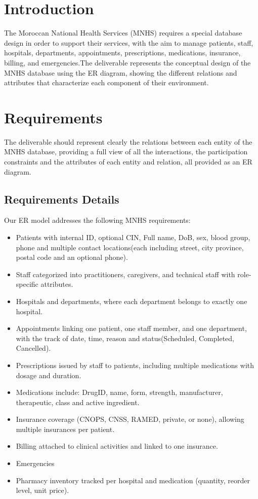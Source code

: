 \documentclass[a4paper,12pt]{article}
\begin{document}
\section{Introduction}
The Moroccan National Health Services (MNHS) requires a special database design in order to support their services, with the aim to manage patients, staff, hospitals, departments, appointments, prescriptions, medications, insurance, billing, and emergencies.The deliverable represents the conceptual design of the MNHS database using the ER diagram, showing the different relations and attributes that characterize each component of their environment. 

\section{Requirements}
The deliverable should represent clearly the relations between each  entity of the MNHS database, providing a full view of all the interactions, the participation constraints and the attributes of each entity and relation, all provided as an ER diagram.
\subsection{Requirements Details}
Our ER model addresses the following MNHS requirements:
\begin{itemize}
    \item Patients with internal ID, optional CIN, Full name, DoB, sex, blood group, phone and multiple contact locations(each including street, city province, postal code and an optional phone).
    \item Staff categorized into practitioners, caregivers, and technical staff with role-specific attributes.
    \item Hospitals and departments, where each department belongs to exactly one hospital.
    \item Appointments linking one patient, one staff member, and one department, with the track of date, time, reason and status(Scheduled, Completed, Cancelled).
    \item Prescriptions issued by staff to patients, including multiple medications with dosage and duration.
    \item Medications include: DrugID, name, form, strength, manufacturer, therapeutic, class and active ingredient.
    \item Insurance coverage (CNOPS, CNSS, RAMED, private, or none), allowing multiple insurances per patient.
    \item Billing attached to clinical activities and linked to one insurance.
    \item Emergencies
    \item Pharmacy inventory tracked per hospital and medication (quantity, reorder level, unit price).
\end{itemize}
\newpage
\end{document}
